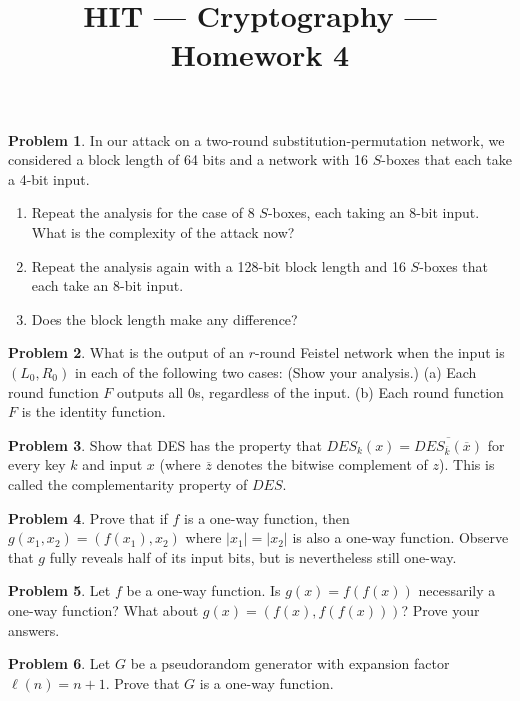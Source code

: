 \documentclass[11pt]{article}
\title{HIT --- Cryptography --- Homework 4}
\theoremstyle{definition}
\providecommand{\abs}[1]{\lvert#1\rvert}
\newtheorem{problem}{Problem}
\begin{document}
\maketitle

\begin{problem}
In our attack on a two-round substitution-permutation network, we considered a block length of 64 bits and a network with 16 $S$-boxes that each take a 4-bit input. 
\begin{enumerate}
\item Repeat the analysis for the case of 8 $S$-boxes, each taking an 8-bit input. What is the complexity of the attack now?
\item Repeat the analysis again with a 128-bit block length and 16 $S$-boxes that each take an 8-bit input.
\item Does the block length make any difference?
\end{enumerate}
\end{problem}

\begin{problem}
What is the output of an $r$-round Feistel network when the input is $(L_0, R_0)$ in each of the following two cases: (Show your analysis.)
(a) Each round function $F$ outputs all $0$s, regardless of the input.
(b) Each round function $F$ is the identity function.
\end{problem}

\begin{problem}
Show that DES has the property that $DES_k(x) = \overline{DES_{\overline{k}}(\overline{x})}$ for every key $k$ and input $x$ (where $\overline{z}$ denotes the bitwise complement of $z$). This is called the complementarity property of $DES$.
\end{problem}

\begin{problem}
Prove that if $f$ is a one-way function, then $g(x_1,x_2) = (f(x_1),x_2)$ where $\abs{x_1} = \abs{x_2}$ is also a one-way function. Observe that $g$ fully reveals half of its input bits, but is nevertheless still one-way.
\end{problem}

\begin{problem}
Let $f$ be a one-way function. Is $g(x) = f(f(x))$ necessarily a one-way function? What about $g(x) = (f(x),f(f(x)))$? Prove your answers.
\end{problem}

\begin{problem}
Let $G$ be a pseudorandom generator with expansion factor $\ell(n)=n+1$. Prove that $G$ is a one-way function.
\end{problem}
\end{document}
